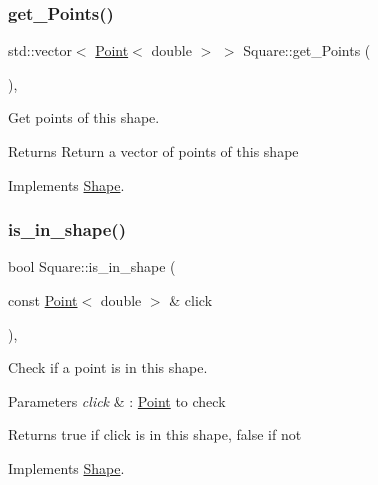 \subsubsection{\texorpdfstring{get\+\_\+\+Points()}{get\_Points()}}
{\footnotesize\ttfamily std\+::vector$<$ \hyperlink{classPoint}{Point}$<$ double $>$ $>$ Square\+::get\+\_\+\+Points (\begin{DoxyParamCaption}{ }\end{DoxyParamCaption})\hspace{0.3cm}{\ttfamily [override]}, {\ttfamily [virtual]}}



Get points of this shape. 

\begin{DoxyReturn}{Returns}
Return a vector of points of this shape 
\end{DoxyReturn}


Implements \hyperlink{classShape_add74a5c682840fa4a519242b1ddbd0b5}{Shape}.

\mbox{\label{classSquare_ada046df2d9fb92286d106d4b3475980a}} 
\subsubsection{\texorpdfstring{is\+\_\+in\+\_\+shape()}{is\_in\_shape()}}
{\footnotesize\ttfamily bool Square\+::is\+\_\+in\+\_\+shape (\begin{DoxyParamCaption}\item[{const \hyperlink{classPoint}{Point}$<$ double $>$ \&}]{click }\end{DoxyParamCaption})\hspace{0.3cm}{\ttfamily [override]}, {\ttfamily [virtual]}}



Check if a point is in this shape. 


\begin{DoxyParams}{Parameters}
{\em click} & \+: \hyperlink{classPoint}{Point} to check \\
\hline
\end{DoxyParams}
\begin{DoxyReturn}{Returns}
true if click is in this shape, false if not 
\end{DoxyReturn}


Implements \hyperlink{classShape_aa09a621da090e42840b4bec7ffb27620}{Shape}.

